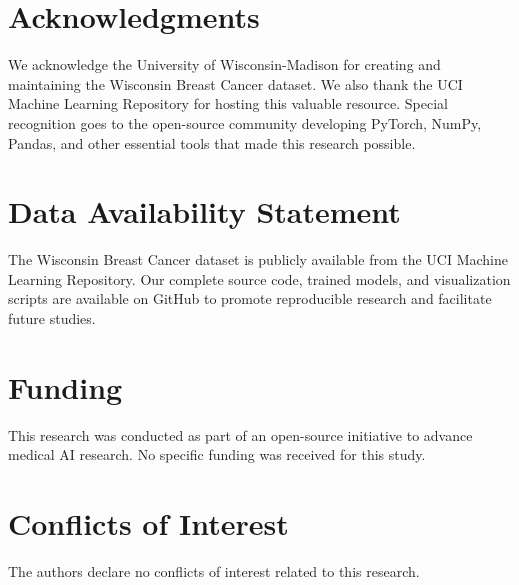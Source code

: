 \documentclass[12pt,a4paper]{article}
\begin{document}
\section*{Acknowledgments}

We acknowledge the University of Wisconsin-Madison for creating and maintaining the Wisconsin Breast Cancer dataset. We also thank the UCI Machine Learning Repository for hosting this valuable resource. Special recognition goes to the open-source community developing PyTorch, NumPy, Pandas, and other essential tools that made this research possible.

\section*{Data Availability Statement}

The Wisconsin Breast Cancer dataset is publicly available from the UCI Machine Learning Repository. Our complete source code, trained models, and visualization scripts are available on GitHub to promote reproducible research and facilitate future studies.

\section*{Funding}

This research was conducted as part of an open-source initiative to advance medical AI research. No specific funding was received for this study.

\section*{Conflicts of Interest}

The authors declare no conflicts of interest related to this research.
\end{document}
